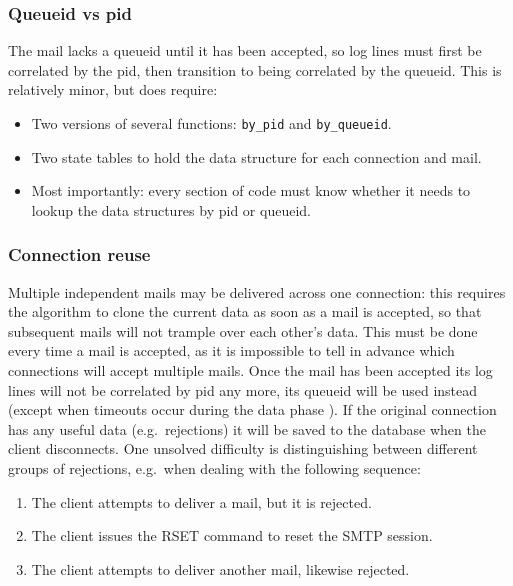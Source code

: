 \subsubsection{Queueid vs pid}

The mail lacks a queueid until it has been accepted, so log lines must
first be correlated by the  \gls{pid}, then transition to
being correlated by the queueid.  This is relatively minor, but does
require:

\begin{itemize}

    \item Two versions of several functions: \texttt{by\_pid} and
        \texttt{by\_queueid}.

    \item Two state tables to hold the data structure for each connection
        and mail.

    \item Most importantly: every section of code must know whether it
        needs to lookup the data structures by \gls{pid} or queueid.

\end{itemize}

\subsubsection{Connection reuse}

\label{connection reuse}

Multiple independent mails may be delivered across one connection: this
requires the algorithm to clone the current data as soon as a mail is
accepted, so that subsequent mails will not trample over each other's data.
This must be done every time a mail is accepted, as it is impossible to
tell in advance which connections will accept multiple mails.  Once the
mail has been accepted its log lines will not be correlated by \gls{pid}
any more, its queueid will be used instead (except when timeouts occur
during the data phase ).  If the
original connection has any useful data (e.g.\ rejections) it will be saved
to the database when the client disconnects.  One unsolved difficulty is
distinguishing between different groups of rejections, e.g.\ when dealing
with the following sequence:

\begin{enumerate}

    \item The client attempts to deliver a mail, but it is rejected.

    \item The client issues the RSET command to reset the \gls{SMTP}
        session.

    \item The client attempts to deliver another mail, likewise rejected.

\end{enumerate}

